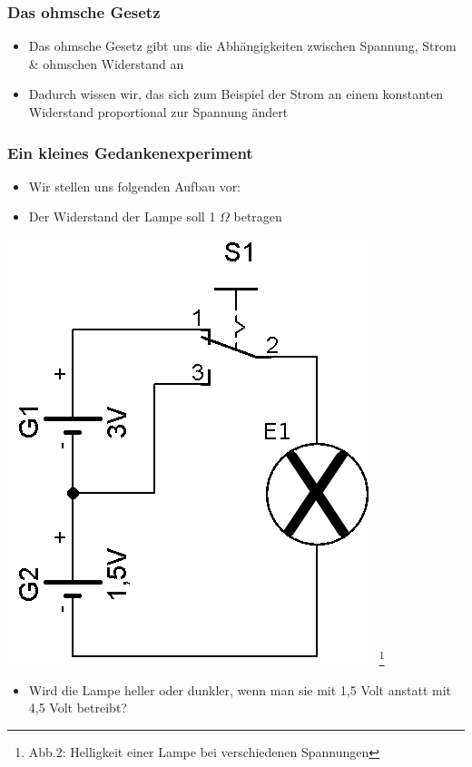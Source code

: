 \begin{frame}
	\frametitle{Das ohmsche Gesetz}
	\begin{itemize}
		\item	Das ohmsche Gesetz gibt uns die Abhängigkeiten zwischen Spannung, Strom \& ohmschen Widerstand an
		\item	Dadurch wissen wir, das sich zum Beispiel der Strom an einem konstanten Widerstand proportional zur Spannung ändert
	\end{itemize}
\end{frame}

\begin{frame}
	\frametitle{Ein kleines Gedankenexperiment}
	\begin{itemize}
		\item	Wir stellen uns folgenden Aufbau vor:
		\item	Der Widerstand der Lampe soll 1 $\Omega$ betragen
	\end{itemize}
	\begin{center}
 		\includegraphics[scale=1]{e03/Strom_Spannung_Abh.png}
 		\footnote{Abb.2: Helligkeit einer Lampe bei verschiedenen Spannungen}
 	\end{center}
 	\begin{itemize}
 		\item	Wird die Lampe heller oder dunkler, wenn man sie mit 1,5 Volt anstatt mit 4,5 Volt betreibt?
 	\end{itemize}
\end{frame}

